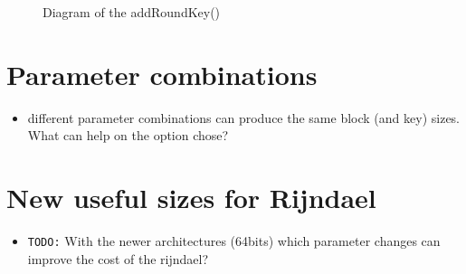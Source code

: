 \documentclass[10pt,a4paper,twoside]{llncs}
\begin{document}
\begin{figure}[h!]
\begin{center}
\caption{Diagram of the addRoundKey()}%
\label{fig:addRoundKey}
\end{center}
\end{figure}


\section{Parameter combinations}\label{sec:parameterCombinations}
\begin{itemize}
 \item different parameter combinations can produce the same block (and key) sizes. What can help on the option chose?
\end{itemize}


\section{New useful sizes for Rijndael}\label{sec:newSizes}
\begin{itemize}
 \item \texttt{TODO:} With the newer architectures (64bits) which parameter changes can improve the cost of the rijndael? \cite{Daemen:1999:EBC:1267115.1267119}
\end{itemize}

% 



\end{document}
